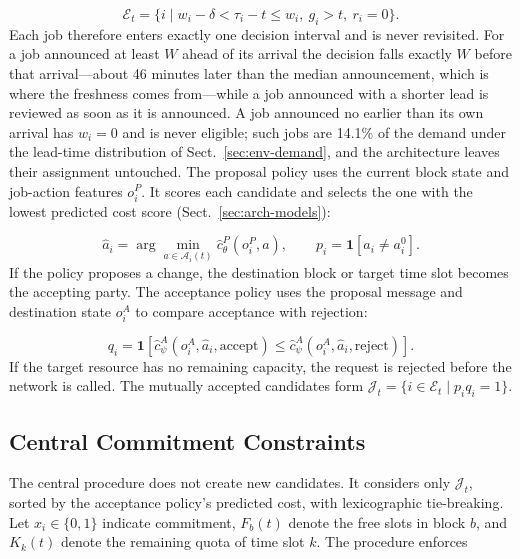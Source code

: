 \begin{equation}
\mathcal E_t=\{i\mid w_i-\delta<\tau_i-t\le w_i,\ g_i>t,\ r_i=0\}.
\end{equation}
Each job therefore enters exactly one decision interval and is never
revisited. For a job announced at least $W$ ahead of its arrival the
decision falls exactly $W$ before that arrival---about 46 minutes later
than the median announcement, which is where the freshness comes
from---while a job announced with a shorter lead is reviewed as soon as
it is announced. A job announced no earlier than its own arrival has
$w_i=0$ and is never eligible; such jobs are 14.1\% of the demand under
the lead-time distribution of Sect.~\ref{sec:env-demand}, and the
architecture leaves their assignment untouched. The proposal
policy uses the current block state and job-action features $o_i^P$. It
scores each candidate and selects the one with the lowest predicted cost
score (Sect.~\ref{sec:arch-models}):

\begin{equation}
\hat a_i=\arg\min_{a\in\mathcal A_i(t)}
\hat c_{\theta}^{P}(o_i^P,a),\qquad
p_i=\mathbf 1[\hat a_i\ne a_i^0].
\end{equation}
If the policy proposes a change, the destination block or target time
slot becomes the accepting party. The acceptance policy uses the
proposal message and destination state $o_i^A$ to compare acceptance
with rejection:

\begin{equation}
q_i=\mathbf 1\!\left[
\hat c_{\psi}^{A}(o_i^A,\hat a_i,\mathrm{accept})
\le
\hat c_{\psi}^{A}(o_i^A,\hat a_i,\mathrm{reject})
\right].
\end{equation}
If the target resource has no remaining capacity, the request is rejected
before the network is called. The mutually accepted candidates form
$\mathcal J_t=\{i\in\mathcal E_t\mid p_iq_i=1\}$.

\subsection{Central Commitment Constraints}
\label{sec:arch-commit}
The central procedure does not create new candidates. It considers only
$\mathcal J_t$, sorted by the acceptance policy's predicted cost, with
lexicographic tie-breaking. Let $x_i\in\{0,1\}$ indicate commitment,
$F_b(t)$ denote the free slots in block $b$, and $K_k(t)$ denote the
remaining quota of time slot $k$. The procedure enforces

